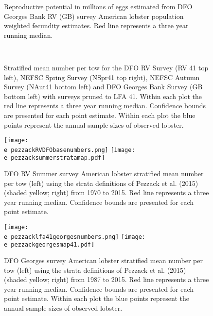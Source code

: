 \documentclass[11pt]{article}
\newcommand{\e}{/backup/bio_data/bio.lobster/figures/} %
\begin{document}
\begin{figure}

\centering
\caption{Reproductive potential in millions of eggs estimated from DFO Georges Bank RV (GB) survey American lobster population weighted fecundity estimates. Red line represents a three year running median. }
\end{figure}



\begin{figure}
\centering
{}
\\

\caption{Stratified mean number per tow for the DFO RV Survey (RV 41 top left), NEFSC Spring Survey (NSpr41 top right), NEFSC Autumn Survey (NAut41 bottom left) and DFO Georges Bank Survey (GB bottom left) with surveys pruned to LFA 41. Within each plot the red line represents a three year running median. Confidence bounds are presented for each point estimate. Within each plot the blue points represent the annual sample sizes of observed lobster.}
\end{figure}
\clearpage


\begin{landscape}
\begin{figure}
\centering
    \texttt{[image: \\e pezzackRVDFObasenumbers.png]} 
    \texttt{[image: \\e pezzacksummerstratamap.pdf]} 
    
    \caption{DFO RV Summer survey American lobster stratified mean number per tow (left) using the strata definitions of Pezzack et al. (2015) (shaded yellow; right) from 1970 to 2015. Red line represents a three year running median. Confidence bounds are presented for each point estimate.}

\end{figure}
\end{landscape}


\begin{landscape}
\begin{figure}
\centering
    \texttt{[image: \\e pezzacklfa41georgesnumbers.png]} 
    \texttt{[image: \\e pezzackgeorgesmap41.pdf]} 
    
    \caption{DFO Georges survey American lobster stratified mean number per tow (left) using the strata definitions of Pezzack et al. (2015) (shaded yellow; right) from 1987 to 2015. Red line represents a three year running median. Confidence bounds are presented for each point estimate. Within each plot the blue points represent the annual sample sizes of observed lobster.}

\end{figure}
\end{landscape}
\end{document}
